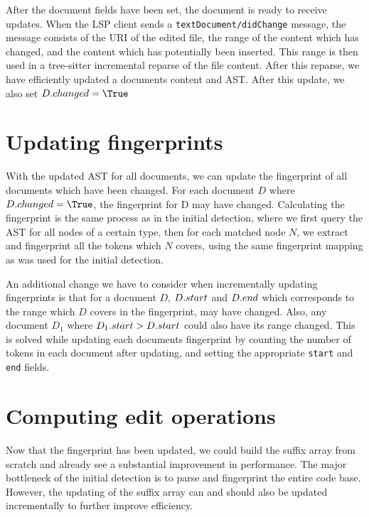 After the document fields have been set, the document is ready to receive updates. When
the LSP client sends a \verb|textDocument/didChange| message, the message consists of the
URI of the edited file, the range of the content which has changed, and the content which
has potentially been inserted. This range is then used in a tree-sitter incremental
reparse of the file content. After this reparse, we have efficiently updated a documents
content and AST. After this update, we also set $\Access{D}{changed} = \True$

\section{Updating fingerprints}

With the updated AST for all documents, we can update the fingerprint of all documents
which have been changed. For each document $D$ where $\Access{D}{changed} = \True$, the
fingerprint for D may have changed. Calculating the fingerprint is the same process as in
the initial detection, where we first query the AST for all nodes of a certain type, then
for each matched node $N$, we extract and fingerprint all the tokens which $N$ covers,
using the same fingerprint mapping as was used for the initial detection.

An additional change we have to consider when incrementally updating fingerprints is that
for a document $D$, ${{D}.{start}}$ and ${{D}.{end}}$ which corresponds to the
range which $D$ covers in the fingerprint, may have changed. Also, any document $D_1$
where ${{D_1}.{start}} > {{D}.{start}}$ could also have its range changed. This is
solved while updating each documents fingerprint by counting the number of tokens in each
document after updating, and setting the appropriate \verb|start| and \verb|end| fields.



\section{Computing edit operations}

Now that the fingerprint has been updated, we could build the suffix array from scratch
and already see a substantial improvement in performance. The major bottleneck of the initial
detection is to parse and fingerprint the entire code base. However, the updating of the
suffix array can and should also be updated incrementally to further improve efficiency.

